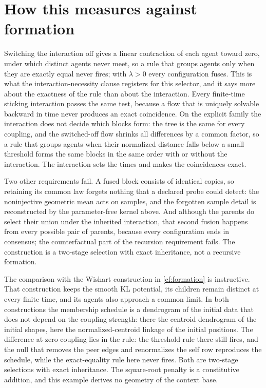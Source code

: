 \section{How this measures against formation}

Switching the interaction off gives a linear contraction of each agent toward zero, under which distinct agents never meet, so a rule that groups agents only when they are exactly equal never fires; with $\lambda>0$ every configuration fuses. This is what the interaction-necessity clause registers for this selector, and it says more about the exactness of the rule than about the interaction. Every finite-time sticking interaction passes the same test, because a flow that is uniquely solvable backward in time never produces an exact coincidence. On the explicit family the interaction does not decide which blocks form: the tree is the same for every coupling, and the switched-off flow shrinks all differences by a common factor, so a rule that groups agents when their normalized distance falls below a small threshold forms the same blocks in the same order with or without the interaction. The interaction sets the times and makes the coincidences exact.

Two other requirements fail. A fused block consists of identical copies, so retaining its common law forgets nothing that a declared probe could detect: the noninjective geometric mean acts on samples, and the forgotten sample detail is reconstructed by the parameter-free kernel above. And although the parents do select their union under the inherited interaction, that second fusion happens from every possible pair of parents, because every configuration ends in consensus; the counterfactual part of the recursion requirement fails. The construction is a two-stage selection with exact inheritance, not a recursive formation.

The comparison with the Wishart construction in \cref{cf:formation} is instructive. That construction keeps the smooth KL potential, its children remain distinct at every finite time, and its agents also approach a common limit. In both constructions the membership schedule is a dendrogram of the initial data that does not depend on the coupling strength: there the centroid dendrogram of the initial shapes, here the normalized-centroid linkage of the initial positions. The difference at zero coupling lies in the rule: the threshold rule there still fires, and the null that removes the peer edges and renormalizes the self row reproduces the schedule, while the exact-equality rule here never fires. Both are two-stage selections with exact inheritance. The square-root penalty is a constitutive addition, and this example derives no geometry of the context base.
